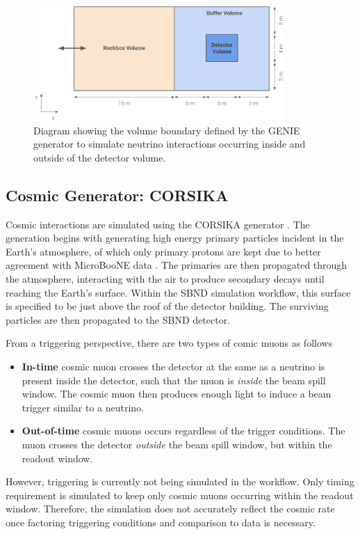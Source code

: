 \begin{figure}[htbp!] 
\centering    
\includegraphics[width=0.85\textwidth]{Rockbox_Volume}
\caption[Rockbox_Volume]{
Diagram showing the volume boundary defined by the GENIE generator to simulate neutrino interactions occurring inside and outside of the detector volume. 
}
\label{fig:Rockbox_Volume}
\end{figure}

\subsection{Cosmic Generator: CORSIKA}
\label{sec:gen_corsika}

Cosmic interactions are simulated using the CORSIKA generator \cite{corsika}.
The generation begins with generating high energy primary particles incident in the Earth's atmosphere, of which only primary protons are kept due to better agreement with MicroBooNE data \cite{}. 
The primaries are then propagated through the atmosphere, interacting with the air to produce secondary decays until reaching the Earth's surface.
Within the SBND simulation workflow, this surface is specified to be just above the roof of the detector building.
The surviving particles are then propagated to the SBND detector.

From a triggering perspective, there are two types of comic muons as follows 
\begin{itemize}
	\item\textbf{In-time} cosmic muon crosses the detector at the same as a neutrino is present inside the detector, such that the muon is \textit{inside} the beam spill window. The cosmic muon then produces enough light to induce a beam trigger similar to a neutrino.
	\item\textbf{Out-of-time} cosmic muons occurs regardless of the trigger conditions. The muon crosses the detector \textit{outside} the beam spill window, but within the readout window.
\end{itemize}
However, triggering is currently not being simulated in the workflow. 
Only timing requirement is simulated to keep only cosmic muons occurring within the readout window.
Therefore, the simulation does not accurately reflect the cosmic rate once factoring triggering conditions and comparison to data is necessary. 


